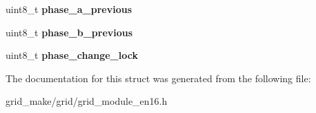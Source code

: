 \begin{DoxyCompactItemize}
\item 
\hypertarget{structgrid__ui__encoder_a7322f4f5f2bc2663811d72ae1c2d284e}{uint8\-\_\-t {\bfseries phase\-\_\-a\-\_\-previous}}\label{structgrid__ui__encoder_a7322f4f5f2bc2663811d72ae1c2d284e}

\item 
\hypertarget{structgrid__ui__encoder_a8d4b81e755ec4bc040faa27e55d05753}{uint8\-\_\-t {\bfseries phase\-\_\-b\-\_\-previous}}\label{structgrid__ui__encoder_a8d4b81e755ec4bc040faa27e55d05753}

\item 
\hypertarget{structgrid__ui__encoder_ad0b31424e6b9a9d363924c288d72693d}{uint8\-\_\-t {\bfseries phase\-\_\-change\-\_\-lock}}\label{structgrid__ui__encoder_ad0b31424e6b9a9d363924c288d72693d}

\end{DoxyCompactItemize}


The documentation for this struct was generated from the following file\-:\begin{DoxyCompactItemize}
\item 
grid\-\_\-make/grid/grid\-\_\-module\-\_\-en16.\-h\end{DoxyCompactItemize}
